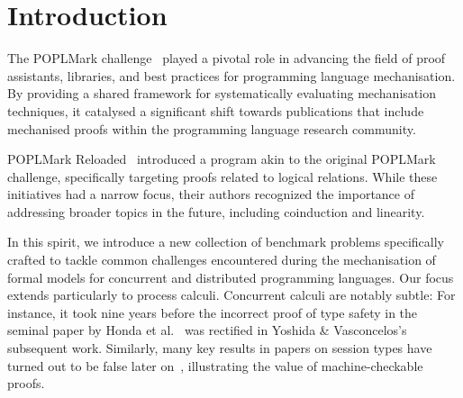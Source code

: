 \documentclass[runningheads]{llncs}
\begin{document}
\section{Introduction}

The POPLMark challenge~\cite{POPLMark}
played a pivotal role in advancing the field of proof assistants,
libraries, and best practices for programming language
mechanisation. By providing a shared framework for systematically
evaluating mechanisation techniques, it catalysed a significant
shift towards publications that include mechanised proofs within the programming language research community.

POPLMark Reloaded~\cite{POPLMarkReloaded} introduced a program akin to
the original POPLMark challenge, specifically targeting proofs related
to logical relations. While these initiatives had a narrow focus,
their authors recognized the importance of addressing broader topics
in the future, including coinduction and linearity.

In this spirit, we introduce a new collection of benchmark problems
specifically crafted to tackle common challenges encountered during
the mechanisation of formal models for concurrent and distributed
programming languages. Our focus extends particularly to process
calculi.
Concurrent calculi are notably subtle: For instance, it took nine
years before the incorrect proof of type safety in the seminal paper
by Honda et al.~\cite{Honda1998} was rectified in Yoshida \&
Vasconcelos’s subsequent work\cite{Yoshida2007}.
Similarly, many
key results in papers on session types have turned out
to be false later on~\cite{Gay2020,10.1145/3290343}, illustrating the
value of machine-checkable proofs.
\end{document}
